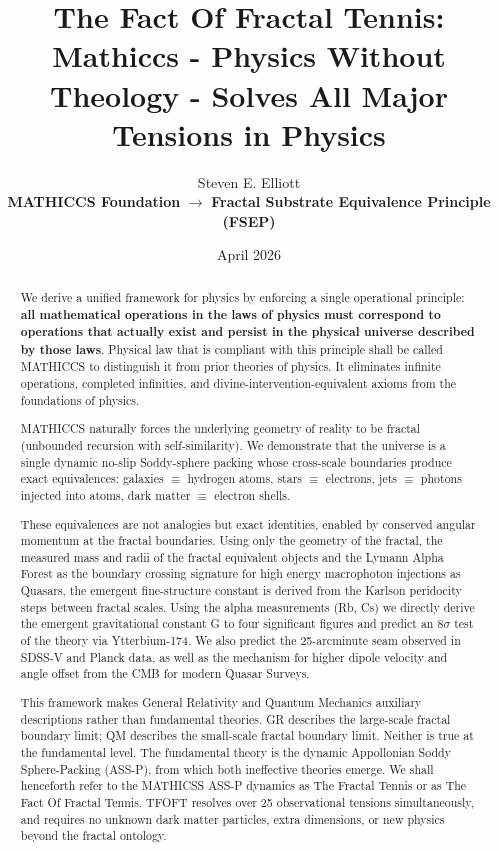 \documentclass[11pt,a4paper]{article}
\title{The Fact Of Fractal Tennis: \\ Mathiccs - Physics Without Theology - Solves All Major Tensions in Physics }
\author{Steven E. Elliott \\ \textbf{MATHICCS Foundation} $\to$ \textbf{Fractal Substrate Equivalence Principle (FSEP)}}
\date{April 2026}
\begin{document}
\maketitle

\begin{abstract}
We derive a unified framework for physics by enforcing a single operational principle: \textbf{all mathematical operations in the laws of physics must correspond to operations that actually exist and persist in the physical universe described by those laws}. Physical law that is compliant with this principle shall be called MATHICCS to distinguish it from prior theories of physics. It eliminates infinite operations, completed infinities, and divine-intervention-equivalent axioms from the foundations of physics. 

MATHICCS naturally forces the underlying geometry of reality to be fractal (unbounded recursion with self-similarity). We demonstrate that the universe is a single dynamic no-slip Soddy-sphere packing whose cross-scale boundaries produce exact equivalences: galaxies $\equiv$ hydrogen atoms, stars $\equiv$ electrons, jets $\equiv$ photons injected into atoms, dark matter $\equiv$ electron shells.

These equivalences are not analogies but exact identities, enabled by conserved angular momentum at the fractal boundaries. Using only the geometry of the fractal, the measured mass and radii of the fractal equivalent objects and the Lymann Alpha Forest as the boundary crossing signature for high energy macrophoton injections as Quasars, the emergent fine-structure constant is derived from the Karlson peridocity steps between fractal scales. Using the alpha measurements (Rb, Cs) we directly derive the emergent gravitational constant G to four significant figures and predict an 8$\sigma$ test of the theory via Ytterbium-174. We also predict the 25-arcminute seam observed in SDSS-V and Planck data, as well as the mechanism for higher dipole velocity and angle offset from the CMB for modern Quasar Surveys.


This framework makes General Relativity and Quantum Mechanics auxiliary descriptions rather than fundamental theories. GR describes the large-scale fractal boundary limit; QM describes the small-scale fractal boundary limit. Neither is true at the fundamental level. The fundamental theory is the dynamic Appollonian Soddy Sphere-Packing (ASS-P), from which both ineffective theories emerge. We shall henceforth refer to the MATHICSS ASS-P dynamics as The Fractal Tennis or as The Fact Of Fractal Tennis. TFOFT resolves over 25 observational tensions simultaneously, and requires no unknown dark matter particles, extra dimensions, or new physics beyond the fractal ontology.

\end{abstract}
\end{document}

